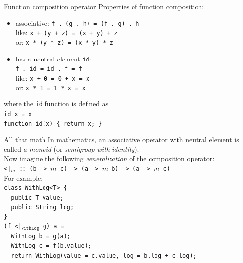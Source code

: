 \documentclass{beamer}
\begin{document}
\begin{frame}{Function composition operator}
  Properties of function composition: \pause
  \begin{itemize}
  \item associative: \texttt{f .\ (g .\ h) = (f .\ g) .\ h} \\ \pause
    like: \texttt{x + (y + z) = (x + y) + z} \\ \pause
    or: \texttt{x * (y * z) = (x * y) * z} \pause
  \item has a neutral element \texttt{id}: \\ \pause
    \texttt{f .\ id = id .\ f = f} \\ \pause
    like: \texttt{x + 0 = 0 + x = x} \\ \pause
    or: \texttt{x * 1 = 1 * x = x} \pause
  \end{itemize}
  where the \texttt{id} function is defined as\\
  \texttt{id x = x} \\ \pause
  \texttt{function id(x) \{ return x; \}}
\end{frame}


\begin{frame}{All that math}
  In mathematics, an associative operator with neutral element is called \textit{a monoid}
  (or \textit{semigroup with identity}). \\ \pause
  Now imagine the following \textit{generalization} of the composition operator: \\ \pause
  \texttt{<|$_m$ ::\ (b -> $m$ c) -> (a -> $m$ b) -> (a -> $m$ c)} \\ \pause
  For example: \\
  \texttt{class WithLog<T> \{ \\
    \ \ public T value; \\
    \ \ public String log; \\
    \}} \\ \pause
  \texttt{(f <|$_\mathtt{WithLog}$ g) a = \\
    \ \ WithLog b = g(a); \\
    \ \ WithLog c = f(b.value); \\
    \ \ return WithLog(value = c.value, log = b.log + c.log); }
\end{frame}
\end{document}
